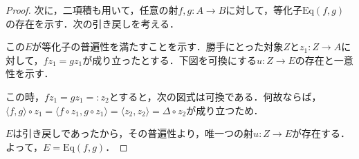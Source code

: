 \documentclass[uplatex, dvipdfmx]{jsarticle}
\begin{document}
\begin{proof}
    次に，二項積も用いて，任意の射$f,g:A\to B$に対して，等化子$\mathrm{Eq}(f,g)$の存在を示す．次の引き戻しを考える．
    \begin{center}
    \end{center}
    この$E$が等化子の普遍性を満たすことを示す．勝手にとった対象$Z$と$z_1:Z\to A$に対して，$fz_1=gz_1$が成り立ったとする．下図を可換にする$u:Z\to E$の存在と一意性を示す．
    \begin{center}
    \end{center}
    この時，$fz_1=gz_1=:z_2$とすると，次の図式は可換である．何故ならば，$\langle f,g\rangle\circ z_1 = \langle f\circ z_1,g\circ z_1\rangle=\langle z_2,z_2\rangle =\Delta\circ z_2$が成り立つため．
    \begin{center}
    \end{center}
    $E$は引き戻しであったから，その普遍性より，唯一つの射$u:Z\to E$が存在する．よって，$E=\mathrm{Eq}(f,g)$．
\end{proof}
\end{document}
